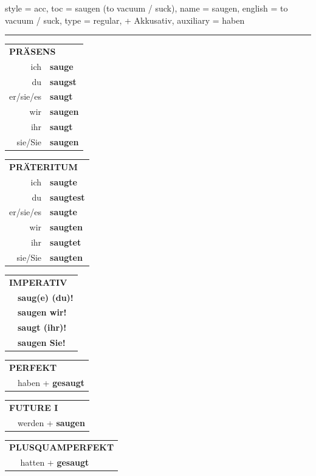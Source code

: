 \begin{verbentry}{
  style = {acc},
  toc = {saugen (to vacuum / suck)},
  name = {saugen},
  english = {to vacuum / suck},
  type = {regular, + Akkusativ},
  auxiliary = {haben}
}


\vspace{5pt}
\hrule
\vspace{5pt}

\begin{tabular}{rl}
\multicolumn{2}{l}{\textbf{PRÄSENS}}\\
ich & \textbf{sauge}\\
du & \textbf{saugst}\\
er/sie/es & \textbf{saugt}\\
wir & \textbf{saugen}\\
ihr & \textbf{saugt}\\
sie/Sie & \textbf{saugen}\\
\end{tabular}
\hfill
\begin{tabular}{rl}
\multicolumn{2}{l}{\textbf{PRÄTERITUM}}\\
ich & \textbf{saugte}\\
du & \textbf{saugtest}\\
er/sie/es & \textbf{saugte}\\
wir & \textbf{saugten}\\
ihr & \textbf{saugtet}\\
sie/Sie & \textbf{saugten}\\
\end{tabular}
\hfill
\begin{tabular}{rl}
\multicolumn{2}{l}{\textbf{IMPERATIV}}\\
& \textbf{saug(e) (du)!}\\
& \textbf{saugen wir!}\\
& \textbf{saugt (ihr)!}\\
& \textbf{saugen Sie!}\\
\end{tabular}

\vspace{10pt}

\begin{tabular}{rl}
\multicolumn{2}{l}{\textbf{PERFEKT}}\\
& haben + \textbf{gesaugt}\\
\end{tabular}
\hfill
\begin{tabular}{rl}
\multicolumn{2}{l}{\textbf{FUTURE I}}\\
& werden + \textbf{saugen}\\
\end{tabular}
\hfill
\begin{tabular}{rl}
\multicolumn{2}{l}{\textbf{PLUSQUAMPERFEKT}}\\
& hatten + \textbf{gesaugt}\\
\end{tabular}


\end{verbentry}
